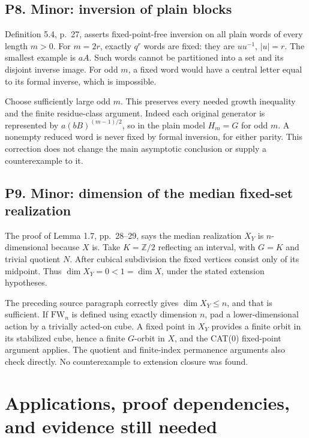 \documentclass[10pt]{article}
\begin{document}
\subsection*{P8. Minor: inversion of plain blocks}
Definition 5.4, p. 27, asserts fixed-point-free inversion on all plain words of every length \(m>0\). For \(m=2r\), exactly \(q^r\) words are fixed: they are \(uu^{-1}\), \(|u|=r\). The smallest example is \(aA\). Such words cannot be partitioned into a set and its disjoint inverse image. For odd \(m\), a fixed word would have a central letter equal to its formal inverse, which is impossible.\par
Choose sufficiently large odd \(m\). This preserves every needed growth inequality and the finite residue-class argument. Indeed each original generator is represented by \(a(bB)^{(m-1)/2}\), so in the plain model \(H_m=G\) for odd \(m\). A nonempty reduced word is never fixed by formal inversion, for either parity. This correction does not change the main asymptotic conclusion or supply a counterexample to it.\par
\subsection*{P9. Minor: dimension of the median fixed-set realization}
The proof of Lemma 1.7, pp. 28–29, says the median realization \(X_Y\) is \(n\)-dimensional because \(X\) is. Take \(K=\mathbb Z/2\) reflecting an interval, with \(G=K\) and trivial quotient \(N\). After cubical subdivision the fixed vertices consist only of its midpoint. Thus \(\dim X_Y=0<1=\dim X\), under the stated extension hypotheses.\par
The preceding source paragraph correctly gives \(\dim X_Y\le n\), and that is sufficient. If \(\mathrm{FW}_n\) is defined using exactly dimension \(n\), pad a lower-dimensional action by a trivially acted-on cube. A fixed point in \(X_Y\) provides a finite orbit in its stabilized cube, hence a finite \(G\)-orbit in \(X\), and the CAT(0) fixed-point argument applies. The quotient and finite-index permanence arguments also check directly. No counterexample to extension closure was found.\par
\section*{Applications, proof dependencies, and evidence still needed}
\end{document}
